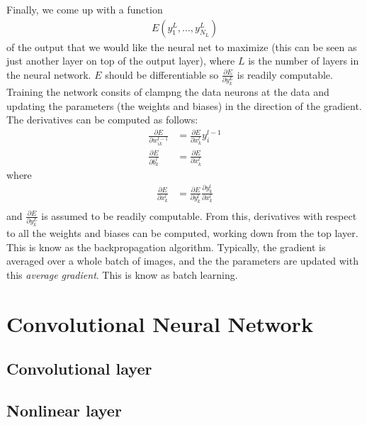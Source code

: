 Finally, we come up with a function 
\begin{align*}
	E\left(y^L_1, \dots, y^L_{N_L}\right)
\end{align*}
of the output that we would like the neural net to maximize (this can be seen as just another layer on top of the output layer), where $L$ is the number of layers in the neural network. $E$ should be differentiable so $\displaystyle\frac{\partial E}{ \partial y^L_k}$ is readily computable. Training the network consits of clampng the data neurons at the data and updating the parameters (the weights and biases) in the direction of the gradient. The derivatives can be computed as follows:
\begin{align*}
\frac{\partial E}{\partial w_{ik}^{l-1}} &= \frac{\partial E}{\partial x^l_k}y^{l-1}_i\\
\frac{\partial E}{\partial b^l_k} &= \frac{\partial E}{\partial x^l_k} 
\end{align*}
where
\begin{align*}
\frac{\partial E}{\partial x^l_k} &= \frac{\partial E}{\partial y^l_k} \frac{\partial y^l_k}{\partial x^l_k}\\
\end{align*}
and $\displaystyle\frac{\partial E}{\partial y^L_k}$ is assumed to be readily computable. From this, derivatives with respect to all the weights and biases can be computed, working down from the top layer. This is know as the backpropagation algorithm. Typically, the gradient is averaged over a whole batch of images, and the the parameters are updated with this \textit{average gradient}. This is know as batch learning.

\section{Convolutional Neural Network}
\subsection{Convolutional layer}

\subsection{Nonlinear layer}

